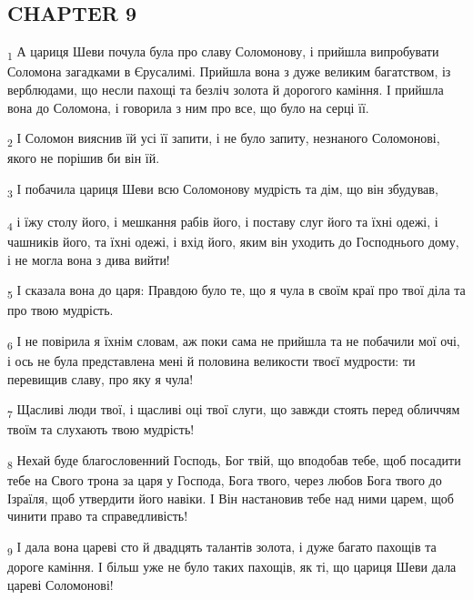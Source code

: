 \subsection{CHAPTER 9}
\begin{tcolorbox}
\textsubscript{1} А цариця Шеви почула була про славу Соломонову, і прийшла випробувати Соломона загадками в Єрусалимі. Прийшла вона з дуже великим багатством, із верблюдами, що несли пахощі та безліч золота й дорогого каміння. І прийшла вона до Соломона, і говорила з ним про все, що було на серці її.
\end{tcolorbox}
\begin{tcolorbox}
\textsubscript{2} І Соломон вияснив їй усі її запити, і не було запиту, незнаного Соломонові, якого не порішив би він їй.
\end{tcolorbox}
\begin{tcolorbox}
\textsubscript{3} І побачила цариця Шеви всю Соломонову мудрість та дім, що він збудував,
\end{tcolorbox}
\begin{tcolorbox}
\textsubscript{4} і їжу столу його, і мешкання рабів його, і поставу слуг його та їхні одежі, і чашників його, та їхні одежі, і вхід його, яким він уходить до Господнього дому, і не могла вона з дива вийти!
\end{tcolorbox}
\begin{tcolorbox}
\textsubscript{5} І сказала вона до царя: Правдою було те, що я чула в своїм краї про твої діла та про твою мудрість.
\end{tcolorbox}
\begin{tcolorbox}
\textsubscript{6} І не повірила я їхнім словам, аж поки сама не прийшла та не побачили мої очі, і ось не була представлена мені й половина великости твоєї мудрости: ти перевищив славу, про яку я чула!
\end{tcolorbox}
\begin{tcolorbox}
\textsubscript{7} Щасливі люди твої, і щасливі оці твої слуги, що завжди стоять перед обличчям твоїм та слухають твою мудрість!
\end{tcolorbox}
\begin{tcolorbox}
\textsubscript{8} Нехай буде благословенний Господь, Бог твій, що вподобав тебе, щоб посадити тебе на Свого трона за царя у Господа, Бога твого, через любов Бога твого до Ізраїля, щоб утвердити його навіки. І Він настановив тебе над ними царем, щоб чинити право та справедливість!
\end{tcolorbox}
\begin{tcolorbox}
\textsubscript{9} І дала вона цареві сто й двадцять талантів золота, і дуже багато пахощів та дороге каміння. І більш уже не було таких пахощів, як ті, що цариця Шеви дала цареві Соломонові!
\end{tcolorbox}

